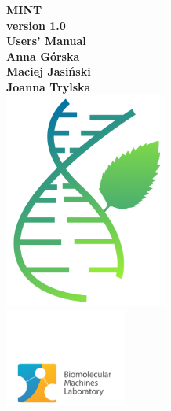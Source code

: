 \documentclass[12pt]{article}
\begin{document}
\begin{titlepage}
\centering
{{\Huge\bf \sffamily MINT}}\\
\vspace{0.35cm}
{{\Huge\bf \sffamily version 1.0}}\\
\vspace{0.5cm}
{{\Huge\bf \sffamily Users' Manual}}\\
\vspace{1cm}
{\large{\bf{\sffamily Anna G\'{o}rska}}}\\
{\large{\bf{\sffamily Maciej Jasi\'{n}ski}}}\\
{\large{\bf{\sffamily Joanna Trylska}}}\\
\vspace{2cm}
\includegraphics[width=0.4\textwidth]{./pictures/Mint.png}\\
\vspace{0.2cm}
\includegraphics[width=0.3\textwidth]{./pictures/logoLMB.png}
\end{titlepage}
\newpage
\end{document}
